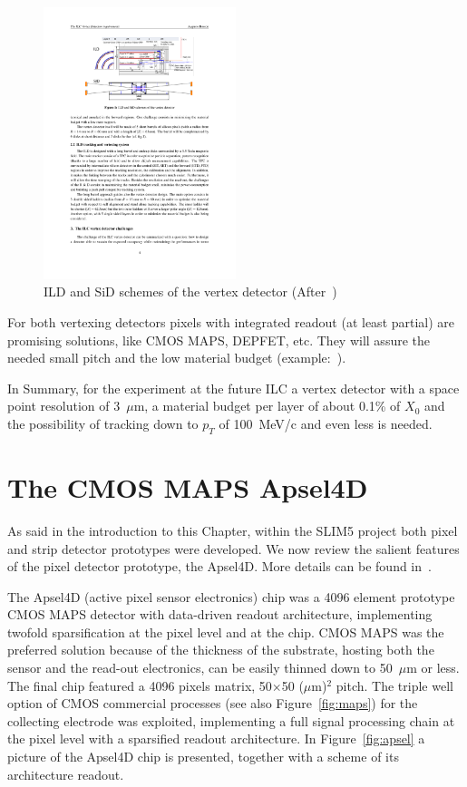 \begin{figure}
\centering
\includegraphics[width=0.5\textwidth]{ILC_concepts.pdf}
\caption{\label{fig:ILC_concepts}ILD and SiD schemes of the vertex detector (After~\cite{ILCVertexing2016})}
\end{figure}

For both vertexing detectors pixels with integrated readout (at least partial) are promising solutions, 
like CMOS MAPS, DEPFET, etc. They will assure the needed small pitch and the low material 
budget (example:~\cite{mimosa26}). 

In Summary, for the experiment at the future ILC a vertex detector with a space point resolution of 
3~$\mu$m, a material budget per layer of about 0.1\% of $X_0$ and the possibility  of    
tracking down to $p_T$ of 100~MeV/c and even less is needed.



\section{The CMOS MAPS Apsel4D}
\label{sec:Apsel4D}

As said in the introduction to this Chapter, within the SLIM5 project both pixel and strip detector
prototypes were developed. We now review the salient features of the pixel 
detector prototype, the Apsel4D. More details can be found in~\cite{BETTARINI2010942,NERI2010195}.

The Apsel4D (active pixel sensor electronics) chip was a 4096 element prototype CMOS MAPS 
detector with 
data-driven readout architecture, implementing twofold sparsification at the pixel level and at the chip. 
CMOS MAPS was the preferred solution because of the thickness of the substrate, hosting both the 
sensor and the read-out electronics, can be easily thinned down to 50~$\mu$m or less. 
The final chip featured a 4096 pixels matrix, 50$\times$50 ($\mu$m)$^2$ pitch. 
  The triple well option of CMOS commercial processes (see also Figure~\ref{fig:maps}) for the collecting electrode was exploited, implementing a full signal processing chain at the pixel level with a sparsified readout architecture. 
In Figure~\ref{fig:apsel} a picture of the Apsel4D chip is presented, together with a scheme of its architecture readout.

